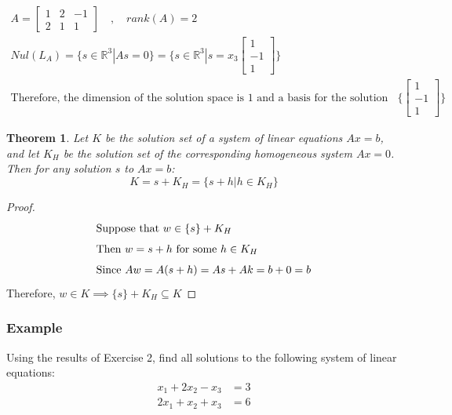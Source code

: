 \documentclass[10pt, oneside]{article}
\newcommand{\R}{\mathbb{R}}
\newtheorem{thm}{Theorem}
\begin{document}
\[
	\begin{split}
		A = \begin{bmatrix} 1 & 2 & -1 \\ 2 & 1 & 1 \end{bmatrix} \quad , \quad rank(A) = 2 \\
		Nul(L_A) = \{s \in \R^3 | As = 0\} = \{s \in \R^3 | s = x_3 \begin{bmatrix} 1 \\ -1 \\ 1 \end{bmatrix}\} \\
		\text{Therefore, the dimension of the solution space is 1 and a basis for the solution space is} \{ \begin{bmatrix} 1 \\ -1 \\ 1 \end{bmatrix} \}
	\end{split}
\]

\begin{thm}
	Let $K$ be the solution set of a system of linear equations $Ax = b$, and let $K_H$ be the solution set of the corresponding homogeneous system $Ax = 0$. Then for any solution $s$ to $Ax = b$:
	$$ K = s + K_H = \{ s + h | h \in K_H \} $$
\end{thm}

\begin{proof}
	\begin{align*}
		\intertext{Suppose that $w \in \{s\} + K_H$}
		\intertext{Then $w = s + h$ for some $h \in K_H$}
		\intertext{Since $Aw = A(s + h) = As + Ak =  b + 0 = b$}
	\end{align*}
	Therefore, $w \in K \implies \{s\} + K_H \subseteq K$
\end{proof}

\subsubsection{Example}
Using the results of Exercise 2, find all solutions to the following system of linear equations:
\[
	\begin{array}{ll}
		x_1 + 2x_2 - x_3 & = 3 \\
		2x_1 + x_2 + x_3 & = 6
	\end{array}
\]
\end{document}
